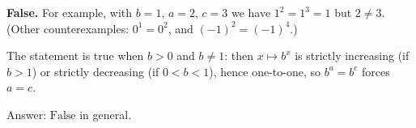 \textbf{False.} For example, with $b=1$, $a=2$, $c=3$ we have $1^2=1^3=1$ but $2\ne3$. (Other counterexamples: $0^1=0^2$, and $(-1)^2=(-1)^4$.)

The statement is true when $b>0$ and $b\ne1$: then $x\mapsto b^x$ is strictly increasing (if $b>1$) or strictly decreasing (if $0<b<1$), hence one-to-one, so $b^a=b^c$ forces $a=c$.

Answer: $\boxed{\text{False}}$ in general.
